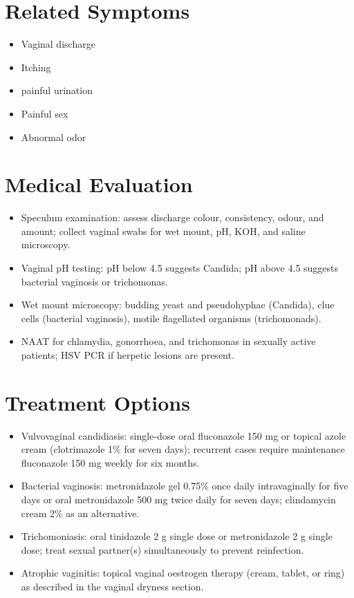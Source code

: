 \section*{Related Symptoms}
\begin{itemize}
  \item Vaginal discharge
  \item Itching
  \item painful urination
  \item Painful sex
  \item Abnormal odor
\end{itemize}

\section*{Medical Evaluation}
\begin{itemize}
  \item Speculum examination: assess discharge colour, consistency, odour, and amount; collect vaginal swabs for wet mount, pH, KOH, and saline microscopy.
  \item Vaginal pH testing: pH below 4.5 suggests Candida; pH above 4.5 suggests bacterial vaginosis or trichomonas.
  \item Wet mount microscopy: budding yeast and pseudohyphae (Candida), clue cells (bacterial vaginosis), motile flagellated organisms (trichomonads).
  \item NAAT for chlamydia, gonorrhoea, and trichomonas in sexually active patients; HSV PCR if herpetic lesions are present.
\end{itemize}

\section*{Treatment Options}
\begin{itemize}
  \item Vulvovaginal candidiasis: single-dose oral fluconazole 150 mg or topical azole cream (clotrimazole 1\% for seven days); recurrent cases require maintenance fluconazole 150 mg weekly for six months.
  \item Bacterial vaginosis: metronidazole gel 0.75\% once daily intravaginally for five days or oral metronidazole 500 mg twice daily for seven days; clindamycin cream 2\% as an alternative.
  \item Trichomoniasis: oral tinidazole 2 g single dose or metronidazole 2 g single dose; treat sexual partner(s) simultaneously to prevent reinfection.
  \item Atrophic vaginitis: topical vaginal oestrogen therapy (cream, tablet, or ring) as described in the vaginal dryness section.
\end{itemize}

